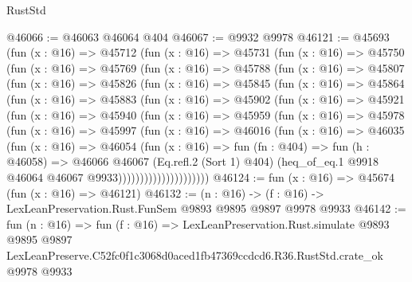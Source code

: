 \begin{lexlean}{RustStd}
\begin{coremodule}
@46066 := @46063 @46064 @404
@46067 := @9932 @9978
@46121 := @45693
    (fun (x : @16) =>
    @45712
      (fun (x : @16) =>
      @45731
        (fun (x : @16) =>
        @45750
          (fun (x : @16) =>
          @45769
            (fun (x : @16) =>
            @45788
              (fun (x : @16) =>
              @45807
                (fun (x : @16) =>
                @45826
                  (fun (x : @16) =>
                  @45845
                    (fun (x : @16) =>
                    @45864
                      (fun (x : @16) =>
                      @45883
                        (fun (x : @16) =>
                        @45902
                          (fun (x : @16) =>
                          @45921
                            (fun (x : @16) =>
                            @45940
                              (fun (x : @16) =>
                              @45959
                                (fun (x : @16) =>
                                @45978
                                  (fun (x : @16) =>
                                  @45997
                                    (fun (x : @16) =>
                                    @46016
                                      (fun (x : @16) =>
                                      @46035
                                        (fun (x : @16) =>
                                        @46054
                                          (fun (x : @16) =>
                                          fun (fn : @404) =>
                                          fun (h : @46058) =>
                                          @46066
                                            @46067
                                            (Eq.refl.{2} (Sort 1) @404)
                                            (heq_of_eq.{1}
                                              @9918
                                              @46064
                                              @46067
                                              @9933)))))))))))))))))))))
@46124 := fun (x : @16) => @45674 (fun (x : @16) => @46121)
@46132 := (n : @16) -> (f : @16) -> LexLeanPreservation.Rust.FunSem @9893 @9895 @9897 @9978 @9933
@46142 := fun (n : @16) =>
  fun (f : @16) =>
  LexLeanPreservation.Rust.simulate
    @9893
    @9895
    @9897
    LexLeanPreserve.C52fc0f1c3068d0aced1fb47369ccdcd6.R36.RustStd.crate_ok
    @9978
    @9933
\end{coremodule}
\end{lexlean}
